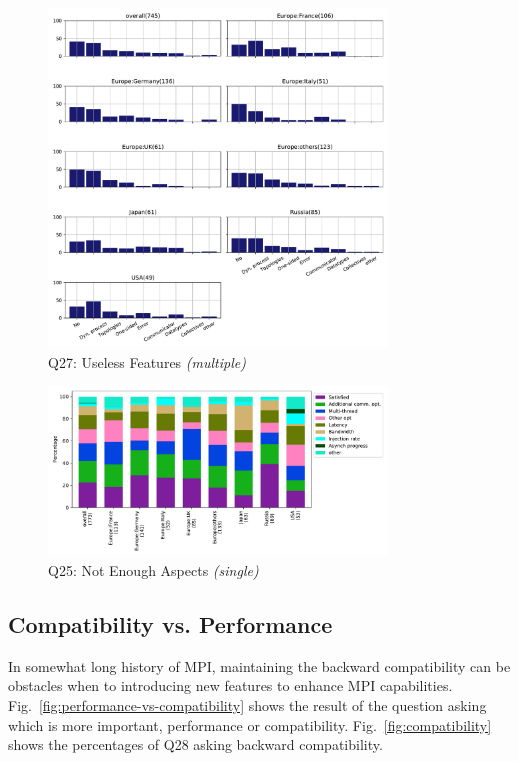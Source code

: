 \documentclass[conference,10pt,letterpaper]{IEEEtran}
\begin{document}
\begin{figure}[htb]
\begin{center}
\includegraphics[width=9cm]{Figs/Q27.pdf}
\caption{Q27: Useless Features {\it(multiple)}}
\label{fig:uselss-features}
\end{center}
\end{figure}

\begin{figure}[htb]
\begin{center}
\includegraphics[width=9cm]{Figs/Q25.pdf}
\caption{Q25: Not Enough Aspects {\it(single)}}
\label{fig:not-enough-aspects}
\end{center}
\end{figure}

\subsection{Compatibility vs. Performance}

In somewhat long history of MPI, maintaining the backward
compatibility can be obstacles when to introducing new features to
enhance MPI capabilities. Fig.~\ref{fig:performance-vs-compatibility} shows the 
result of the question asking which is more important, performance or 
compatibility. Fig.~\ref{fig:compatibility} shows the percentages of
Q28 asking backward compatibility.
\end{document}
